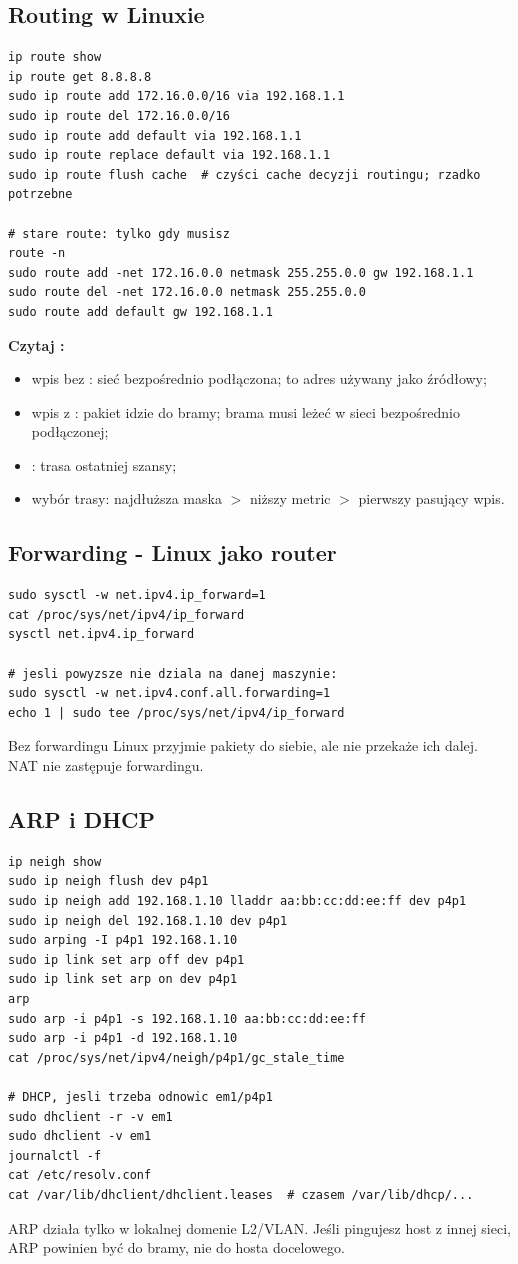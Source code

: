 \documentclass[10pt,a5paper,twoside]{article}
\newcommand{\kw}[1]{\textbf{#1}}
\newcommand{\code}[1]{\texttt{\detokenize{#1}}}
\begin{document}
\subsection{Routing w Linuxie}
\begin{lstlisting}
ip route show
ip route get 8.8.8.8
sudo ip route add 172.16.0.0/16 via 192.168.1.1
sudo ip route del 172.16.0.0/16
sudo ip route add default via 192.168.1.1
sudo ip route replace default via 192.168.1.1
sudo ip route flush cache  # czyści cache decyzji routingu; rzadko potrzebne

# stare route: tylko gdy musisz
route -n
sudo route add -net 172.16.0.0 netmask 255.255.0.0 gw 192.168.1.1
sudo route del -net 172.16.0.0 netmask 255.255.0.0
sudo route add default gw 192.168.1.1
\end{lstlisting}
\kw{Czytaj \code{ip route}:}
\begin{itemize}
  \item wpis bez \code{via}: sieć bezpośrednio podłączona; \code{src} to adres używany jako źródłowy;
  \item wpis z \code{via}: pakiet idzie do bramy; brama musi leżeć w sieci bezpośrednio podłączonej;
  \item \code{default}: trasa ostatniej szansy;
  \item wybór trasy: najdłuższa maska $>$ niższy metric $>$ pierwszy pasujący wpis.
\end{itemize}

\subsection{Forwarding - Linux jako router}
\begin{lstlisting}
sudo sysctl -w net.ipv4.ip_forward=1
cat /proc/sys/net/ipv4/ip_forward
sysctl net.ipv4.ip_forward

# jesli powyzsze nie dziala na danej maszynie:
sudo sysctl -w net.ipv4.conf.all.forwarding=1
echo 1 | sudo tee /proc/sys/net/ipv4/ip_forward
\end{lstlisting}
Bez forwardingu Linux przyjmie pakiety do siebie, ale nie przekaże ich dalej. NAT nie zastępuje forwardingu.

\subsection{ARP i DHCP}
\begin{lstlisting}
ip neigh show
sudo ip neigh flush dev p4p1
sudo ip neigh add 192.168.1.10 lladdr aa:bb:cc:dd:ee:ff dev p4p1
sudo ip neigh del 192.168.1.10 dev p4p1
sudo arping -I p4p1 192.168.1.10
sudo ip link set arp off dev p4p1
sudo ip link set arp on dev p4p1
arp
sudo arp -i p4p1 -s 192.168.1.10 aa:bb:cc:dd:ee:ff
sudo arp -i p4p1 -d 192.168.1.10
cat /proc/sys/net/ipv4/neigh/p4p1/gc_stale_time

# DHCP, jesli trzeba odnowic em1/p4p1
sudo dhclient -r -v em1
sudo dhclient -v em1
journalctl -f
cat /etc/resolv.conf
cat /var/lib/dhclient/dhclient.leases  # czasem /var/lib/dhcp/...
\end{lstlisting}
ARP działa tylko w lokalnej domenie L2/VLAN. Jeśli pingujesz host z innej sieci, ARP powinien być do bramy, nie do hosta docelowego.
\end{document}
